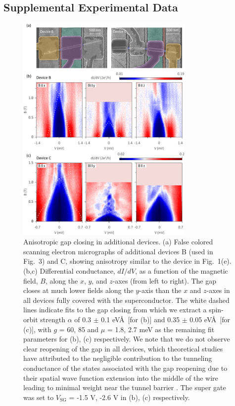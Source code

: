 \subsection{Supplemental Experimental Data}
\begin{figure}[h!]
\centering
\includegraphics[width=0.77\textwidth]{chapter_spinorbit/figures/SFig1_Bsweeps_reproduced.pdf}
\caption{\label{fig:BsweepsReproduced}
Anisotropic gap closing in additional devices.
(a) False colored scanning electron micrographs of additional devices B (used in Fig.~3) and C, showing anisotropy similar to the device in Fig.~1(e).
(b,c) Differential conductance, $dI/dV$, as a function of the magnetic field, $B$, along the $x$, $y$, and $z$-axes (from left to right).
The gap closes at much lower fields along the $y$-axis than the $x$ and $z$-axes in all devices fully covered with the superconductor.
The white dashed lines indicate fits to the gap closing from which we extract a spin-orbit strength $\alpha$ of 0.3 $\pm$ 0.1 eV\AA\ [for (b)] and 0.35 $\pm$ 0.05 eV\AA\ [for (c)], with $g$ = 60, 85 and $\mu$ = 1.8, 2.7 meV as the remaining fit parameters for (b), (c) respectively.
We note that we do not observe clear reopening of the gap in all devices, which theoretical studies have attributed to the negligible contribution to the tunneling conductance of the states associated with the gap reopening due to their spatial wave function extension into the middle of the wire leading to minimal weight near the tunnel barrier \cite{Prada2012,Pientka2012,Stanescu2012,Liu2019}.
The super gate was set to $V_{\mathrm{SG}}$ = -1.5 V, -2.6 V in (b), (c) respectively.
}
\end{figure}


